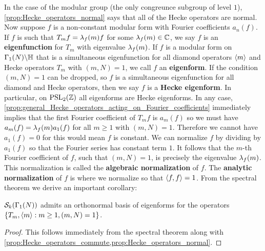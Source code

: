       In the case of the modular group (the only congreunce subgroup of level $1$), \cref{prop:Hecke_operators_normal} says that all of the Hecke operators are normal. Now suppose $f$ is a non-constant modular form with Fourier coefficients $a_{n}(f)$. If $f$ is such that $T_{m}f = \lambda_{f}(m)f$ for some $\lambda_{f}(m) \in \mathbb{C}$, we say $f$ is an \textbf{eigenfunction} for $T_{m}$ with eigenvalue $\lambda_{f}(m)$. If $f$ is a modular form on $\Gamma_{1}(N)\backslash\mathbb{H}$ that is a simultaneous eigenfunction for all diamond operators $\langle m\rangle$ and Hecke operators $T_{m}$ with $(m,N) = 1$, we call $f$ an \textbf{eigenform}. If the condition $(m,N) = 1$ can be dropped, so $f$ is a simultaneous eigenfunction for all diamond and Hecke operators, then we say $f$ is a \textbf{Hecke eigenform}. In particular, on $\mathrm{PSL}_{2}(\mathbb{Z})$ all eigenforms are Hecke eigenforms. In any case, \cref{prop:general_Hecke_operators_acting_on_Fourier_coefficients} immediately implies that the first Fourier coefficient of $T_{m}f$ is $a_{m}(f)$ so we must have $a_{m}(f) = \lambda_{f}(m)a_{1}(f)$ for all $m \ge 1$ with $(m,N) = 1$. Therefore we cannot have $a_{1}(f) = 0$ for this would mean $f$ is constant. We can normalize $f$ by dividing by $a_{1}(f)$ so that the Fourier series has constant term $1$. It follows that the $m$-th Fourier coefficient of $f$, such that $(m,N) = 1$, is precisely the eigenvalue $\lambda_{f}(m)$. This normalization is called the \textbf{algebraic normalization} of $f$. The \textbf{analytic normalization} of $f$ is where we normalize so that $\langle f,f\rangle = 1$. From the spectral theorem we derive an important corollary:

      \begin{theorem}\label{thm:eigenforms_forms_spectral_theory}
        $\mathcal{S}_{k}(\Gamma_{1}(N))$ admits an orthonormal basis of eigenforms for the operators $\{T_{m},\langle m\rangle:m \ge 1, (m,N) = 1\}$.
      \end{theorem}
      \begin{proof}
        This follows immediately from the spectral theorem along with \cref{prop:Hecke_operators_commute,prop:Hecke_operators_normal}.
      \end{proof}
